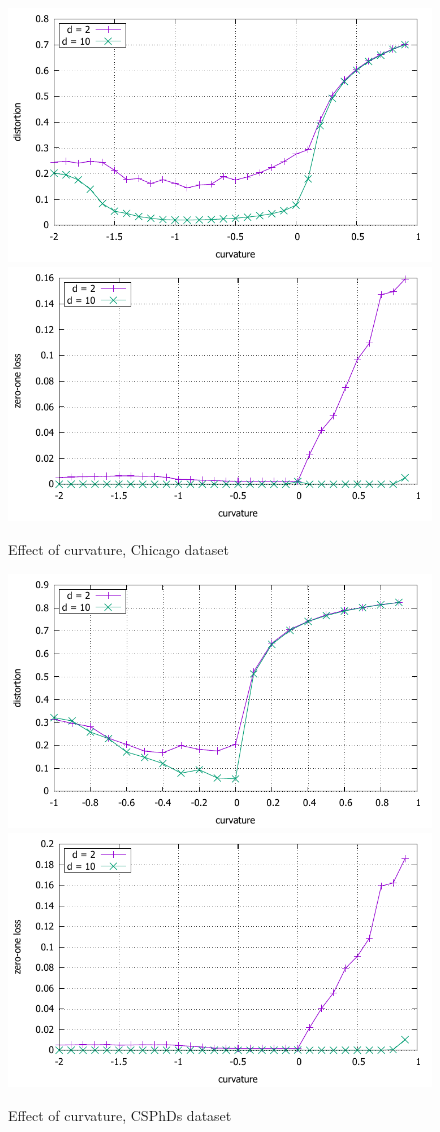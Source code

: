 \documentclass{article} %
\begin{document}
\begin{figure}
    \centering
    \includegraphics[width = 0.49 \textwidth]{chicago_distortion.pdf}
    \includegraphics[width = 0.49 \textwidth]{chicago_zero_one.pdf}
    \caption{Effect of curvature, Chicago dataset}
    \label{fig:chicago}
\end{figure}

\begin{figure}
    \centering
    \includegraphics[width = 0.49 \textwidth]{CSPhDs_distortion.pdf}
    \includegraphics[width = 0.49 \textwidth]{CSPhDs_zero_one.pdf}
    \caption{Effect of curvature, CSPhDs dataset}
    \label{fig:CSPhDs}
\end{figure}
\end{document}
